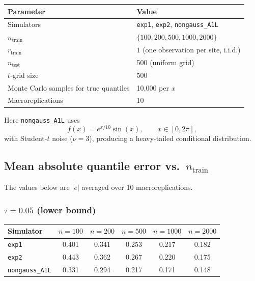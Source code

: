 \documentclass[11pt]{article}
\begin{document}
	\begin{center}
		\begin{tabular}{ll}
			\toprule
			Parameter & Value \\
			\midrule
			Simulators & \texttt{exp1}, \texttt{exp2}, \texttt{nongauss\_A1L} \\
			$n_{\mathrm{train}}$ & $\{100,200,500,1000,2000\}$ \\
			$r_{\mathrm{train}}$ & $1$ (one observation per site, i.i.d.) \\
			$n_{\mathrm{test}}$ & 500 (uniform grid) \\
			$t$-grid size & 500 \\
			Monte Carlo samples for true quantiles & 10{,}000 per $x$ \\
			Macroreplications & 10 \\
			\bottomrule
		\end{tabular}
	\end{center}
	
	Here \texttt{nongauss\_A1L} uses
	\[
	f(x)=e^{x/10}\sin(x), \qquad x\in[0,2\pi],
	\]
	with Student-$t$ noise ($\nu=3$), producing a heavy-tailed conditional distribution.
	
	\subsection{Mean absolute quantile error vs.\ $n_{\mathrm{train}}$}
	
	The values below are $\overline{|e|}$ averaged over 10 macroreplications.
	
	\subsubsection{$\tau = 0.05$ (lower bound)}
	\begin{center}
		\begin{tabular}{lccccc}
			\toprule
			Simulator & $n=100$ & $n=200$ & $n=500$ & $n=1000$ & $n=2000$ \\
			\midrule
			\texttt{exp1}          & 0.401 & 0.341 & 0.253 & 0.217 & 0.182 \\
			\texttt{exp2}          & 0.443 & 0.362 & 0.267 & 0.220 & 0.175 \\
			\texttt{nongauss\_A1L} & 0.331 & 0.294 & 0.217 & 0.171 & 0.148 \\
			\bottomrule
		\end{tabular}
	\end{center}
	
\end{document}

